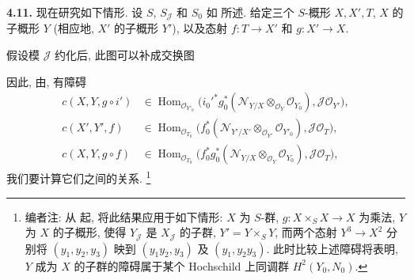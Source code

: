 
\setcounter{footnote}{98}

\medskip
\noindent{}\textbf{4.11.}
现在研究如下情形. 设 \(S\), \(S_{\mathscr J}\) 和 \(S_0\)
如 所述.
给定三个 \(S\)-概形 \(X,X',T\), \(X\) 的子概形 \(Y\)
(相应地, \(X'\) 的子概形 \(Y'\)), 以及态射
\(f:T\to X'\) 和 \(g:X'\to X\).

\begin{center}
\end{center}

假设模 \(\mathscr J\) 约化后, 此图可以补成交换图

\begin{center}
\end{center}

因此, 由, 有障碍
\begin{align*}
 c(X,Y,g\circ i')&\in
 \operatorname{Hom}_{\mathscr O_{Y'_0}}
 \bigl(i_0'^*g_0^*(\mathscr N_{Y/X}
   \otimes_{\mathscr O_Y}\mathscr O_{Y_0}),
   \mathscr J\mathscr O_{Y'}\bigr),\\
 c(X',Y',f)&\in
 \operatorname{Hom}_{\mathscr O_{T_0}}
 \bigl(f_0^*(\mathscr N_{Y'/X'}
   \otimes_{\mathscr O_{Y'}}\mathscr O_{Y'_0}),
   \mathscr J\mathscr O_T\bigr),\\
 c(X,Y,g\circ f)&\in
 \operatorname{Hom}_{\mathscr O_{T_0}}
 \bigl(f_0^*g_0^*(\mathscr N_{Y/X}
   \otimes_{\mathscr O_Y}\mathscr O_{Y_0}),
   \mathscr J\mathscr O_T\bigr),
\end{align*}
我们要计算它们之间的关系.
\footnote{编者注: 从 起, 将此结果应用于如下情形:
\(X\) 为 \(S\)-群, \(g:X\times_S X\to X\) 为乘法,
\(Y\) 为 \(X\) 的子概形, 使得 \(Y_{\mathscr J}\) 是
\(X_{\mathscr J}\) 的子群, \(Y'=Y\times_S Y\),
而两个态射 \(Y^3\to X^2\) 分别将 \((y_1,y_2,y_3)\) 映到
\((y_1y_2,y_3)\) 及 \((y_1,y_2y_3)\).
此时比较上述障碍将表明, \(Y\) 成为 \(X\) 的子群的障碍属于某个
Hochschild 上同调群 \(H^2(Y_0,N_0)\).}

